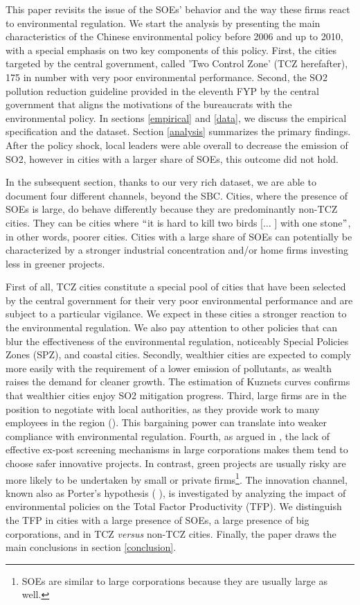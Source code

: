 \documentclass[12pt]{article}
\begin{document}
This paper revisits the issue of the SOEs' behavior and the way these firms react to environmental regulation. We start the analysis by presenting the main characteristics of the Chinese environmental policy before 2006 and up to 2010, with a special emphasis on two key components of this policy. First, the cities targeted by the central government, called 'Two Control Zone' (TCZ herefafter), 175 in number with very poor environmental performance. Second, the SO2 pollution reduction guideline provided in the eleventh FYP by the central government that aligns the motivations of the bureaucrats with the environmental policy. In sections \ref{empirical} and \ref{data}, we discuss the empirical specification and the dataset. Section \ref{analysis} summarizes the primary findings. After the policy shock, local leaders were able overall to decrease the emission of SO2, however in cities with a larger share of SOEs, this outcome did not hold. 


In the subsequent section, thanks to our very rich dataset, we are able to document four different channels, beyond the SBC. Cities, where the presence of SOEs is large, do behave differently because they are predominantly non-TCZ cities. They can be cities where $``$it is hard to kill two birds [$ \ldots $ ] with one stone$"$, in other words, poorer cities. Cities with a large share of SOEs can potentially be characterized by a stronger industrial concentration and/or home firms investing less in greener projects. 


First of all, TCZ cities constitute a special pool of cities that have been selected by the central government for their very poor environmental performance and are subject to a particular vigilance. We expect in these cities a stronger reaction to the environmental regulation. We also pay attention to other policies that can blur the effectiveness of the environmental regulation, noticeably Special Policies Zones (SPZ), and coastal cities. Secondly, wealthier cities are expected to comply more easily with the requirement of a lower emission of pollutants, as wealth raises the demand for cleaner growth. The estimation of Kuznets curves confirms that wealthier cities enjoy SO2 mitigation progress. Third, large firms are in the position to negotiate with local authorities, as they provide work to many employees in the region (\cite{Wang2003-ar}). This bargaining power can translate into weaker compliance with environmental regulation. Fourth, as argued in \cite{Huang1998-pi}, the lack of effective ex-post screening mechanisms in large corporations makes them tend to choose safer innovative projects. In contrast, green projects are usually risky are more likely to be undertaken by small or private firms\footnote{ SOEs are similar to large corporations because they are usually large as well.}. The innovation channel, known also as Porter's hypothesis ( \cite{Porter1995-vr}), is investigated by analyzing the impact of environmental policies on the Total Factor Productivity (TFP). We distinguish the TFP in cities with a large presence of SOEs, a large presence of big corporations, and in TCZ \textit{versus} non-TCZ cities. Finally, the paper draws the main conclusions in section \ref{conclusion}. 
\end{document}
